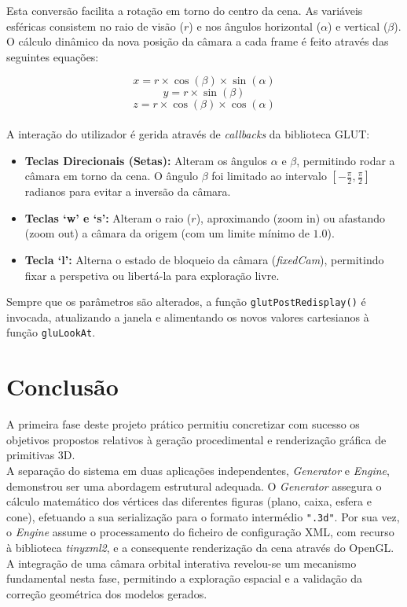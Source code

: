 \documentclass[11pt, a4paper, fleqn]{article}
\begin{document}
\noindent Esta conversão facilita a rotação em torno do centro da cena. As variáveis esféricas consistem no raio de visão ($r$) e nos ângulos horizontal ($\alpha$) e vertical ($\beta$). O cálculo dinâmico da nova posição da câmara a cada frame é feito através das seguintes equações:

$$x = r \times \cos(\beta) \times \sin(\alpha)$$
$$y = r \times \sin(\beta)$$
$$z = r \times \cos(\beta) \times \cos(\alpha)$$
\\
\noindent A interação do utilizador é gerida através de \textit{callbacks} da biblioteca GLUT:
\begin{itemize}
    \item \textbf{Teclas Direcionais (Setas):} Alteram os ângulos $\alpha$ e $\beta$, permitindo rodar a câmara em torno da cena. O ângulo $\beta$ foi limitado ao intervalo $[-\frac{\pi}{2}, \frac{\pi}{2}]$ radianos para evitar a inversão da câmara.
    \item \textbf{Teclas `w' e `s':} Alteram o raio ($r$), aproximando (zoom in) ou afastando (zoom out) a câmara da origem (com um limite mínimo de $1.0$).
    \item \textbf{Tecla `l':} Alterna o estado de bloqueio da câmara (\textit{fixedCam}), permitindo fixar a perspetiva ou libertá-la para exploração livre.
\end{itemize}

\noindent Sempre que os parâmetros são alterados, a função \texttt{glutPostRedisplay()} é invocada, atualizando a janela e alimentando os novos valores cartesianos à função \texttt{gluLookAt}.


\newpage

\section{Conclusão}

A primeira fase deste projeto prático permitiu concretizar com sucesso os objetivos propostos relativos à geração procedimental e renderização gráfica de primitivas 3D.\\

\noindent A separação do sistema em duas aplicações independentes, \textit{Generator} e \textit{Engine}, demonstrou ser uma abordagem estrutural adequada. O \textit{Generator} assegura o cálculo matemático dos vértices das diferentes figuras (plano, caixa, esfera e cone), efetuando a sua serialização para o formato intermédio \texttt{".3d"}. Por sua vez, o \textit{Engine} assume o processamento do ficheiro de configuração XML, com recurso à biblioteca \textit{tinyxml2}, e a consequente renderização da cena através do OpenGL. A integração de uma câmara orbital interativa revelou-se um mecanismo fundamental nesta fase, permitindo a exploração espacial e a validação da correção geométrica dos modelos gerados.\\
\end{document}
